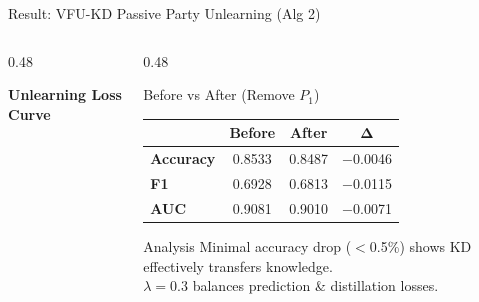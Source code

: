 \documentclass[aspectratio=169, 11pt]{beamer}
\begin{document}
\begin{frame}{Result: VFU-KD Passive Party Unlearning (Alg 2)}
  \begin{columns}[T]
    \begin{column}{0.48\textwidth}
      \begin{center}
        \textbf{Unlearning Loss Curve}\\[0.3cm]
      \end{center}
    \end{column}
    \begin{column}{0.48\textwidth}
      \begin{block}{Before vs After (Remove $P_1$)}
        \centering
        \renewcommand{\arraystretch}{1.3}
        \begin{tabular}{>{\bfseries\footnotesize}l >{\footnotesize}c >{\footnotesize}c >{\footnotesize}c}
          \toprule
          & \textbf{Before} & \textbf{After} & $\boldsymbol{\Delta}$ \\
          \midrule
          Accuracy & 0.8533 & 0.8487 & \textcolor{accentred}{$-$0.0046} \\
          F1       & 0.6928 & 0.6813 & \textcolor{accentred}{$-$0.0115} \\
          AUC      & 0.9081 & 0.9010 & \textcolor{accentred}{$-$0.0071} \\
          \bottomrule
        \end{tabular}
      \end{block}
      \vspace{0.3cm}
      \begin{exampleblock}{Analysis}
        \footnotesize
        Minimal accuracy drop ($<$0.5\%) shows KD effectively transfers knowledge.\\
        $\lambda = 0.3$ balances prediction \& distillation losses.
      \end{exampleblock}
    \end{column}
  \end{columns}
\end{frame}
\end{document}
